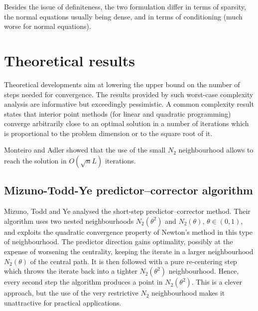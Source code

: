 Besides the issue of definiteness, the two formulation differ in
terms of sparsity, the normal equations usually being dense, and
in terms of conditioning (much worse for normal equations).



%
%
\section{Theoretical results}
\label{sec:TheoreticalResults}

Theoretical developments aim at lowering the upper bound on the number 
of steps needed for convergence. The results provided by such worst-case 
complexity analysis
are informative but exceedingly pessimistic. A common complexity result 
states that interior point methods (for linear and quadratic programming) 
converge arbitrarily close to an optimal solution in a number of iterations 
which is proportional to the problem dimension or to the square root of it.

Monteiro and Adler \cite{MonteiroAdler89a} showed that the use of
the small $N_2$ neighbourhood allows to reach the solution in
$O(\sqrt{n}L)$ iterations.


%
%
\subsection{Mizuno-Todd-Ye predictor--corrector algorithm}

Mizuno, Todd and Ye \cite{MizunoToddYe} analysed the short-step 
predictor--corrector method. Their algorithm uses two nested neighbourhoods 
$N_2(\theta^2)$ and $N_2(\theta)$, $\theta \in (0,1)$, and exploits the
quadratic convergence property of Newton's method in this type of 
neighbourhood.
The predictor direction gains optimality, possibly at the expense of
worsening the centrality, keeping the iterate in a larger neighbourhood
$N_2(\theta)$ of the central path. It is then followed with a 
pure re-centering step which throws the iterate back into a 
tighter $N_2(\theta^2)$ neighbourhood. Hence, every second step the 
algorithm produces a point in $N_2(\theta^2)$. This is a clever 
approach, but the use of the very restrictive $N_2$ neighbourhood 
makes it unattractive for practical applications.

